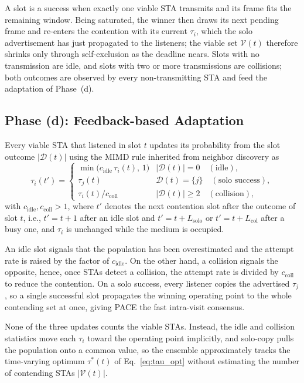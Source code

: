 \documentclass[conference]{IEEEtran}
\begin{document}
A slot is a success when exactly one viable STA transmits and its frame fits the remaining window. Being saturated, the winner then draws its next pending frame and re-enters the contention with its current $\tau_i$, which the solo advertisement has just propagated to the listeners; the viable set $\mathcal{V}(t)$ therefore shrinks only through self-exclusion as the deadline nears. Slots with no transmission are idle, and slots with two or more transmissions are collisions; both outcomes are observed by every non-transmitting STA and feed the adaptation of Phase~(d).

\subsection{Phase (d): Feedback-based Adaptation}
\label{subsec:adaptive_control}

Every viable STA that listened in slot $t$ updates its probability from the slot outcome $|\mathcal{D}(t)|$ using the MIMD rule inherited from neighbor discovery as
\begin{equation}
\tau_i(t') =
\begin{cases}
\min\bigl(c_\mathrm{idle}\,\tau_i(t),\,1\bigr) & |\mathcal{D}(t)|=0 \quad(\text{idle}),\\[2pt]
\tau_j(t)              & \mathcal{D}(t)=\{j\} \quad(\text{solo success}),\\[2pt]
\tau_i(t) / c_\mathrm{coll}          & |\mathcal{D}(t)|\ge 2 \quad(\text{collision}),
\end{cases}
\label{eq:mimd}
\end{equation}
with $c_\mathrm{idle},c_\mathrm{coll}>1$, where $t'$ denotes the next contention slot after the outcome of slot $t$, i.e., $t'=t+1$ after an idle slot and $t'=t+L_\mathrm{solo}$ or $t'=t+L_\mathrm{col}$ after a busy one, and $\tau_i$ is unchanged while the medium is occupied. 

An idle slot signals that the
population has been overestimated and the attempt rate is raised by the factor of $c_\mathrm{idle}$. On the other hand, a collision signals the opposite, hence, once STAs detect a collision, the attempt rate is divided by $c_\mathrm{coll}$ to reduce the contention. On a solo success, every listener copies the advertised $\tau_j$, so a single successful slot propagates the winning operating point to the whole contending set at once, giving PACE the fast intra-visit consensus.

None of the three updates counts the viable STAs. Instead, the idle and collision statistics move each $\tau_i$ toward the operating point implicitly, and solo-copy pulls the population onto a common value, so the ensemble approximately tracks the time-varying optimum $\tau^*(t)$ of Eq.~\eqref{eq:tau_opt} without estimating the number of contending STAs $|\mathcal{V}(t)|$. 
\end{document}

